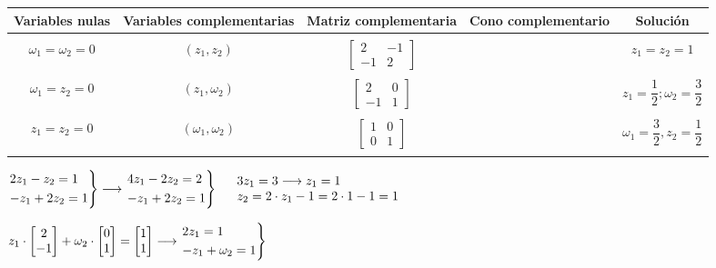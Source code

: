 \begin{enumerate}[label=\color{red}\arabic*.]
\begin{tabular}{c|c|c|c|c}
Variables nulas & Variables complementarias & Matriz complementaria & Cono complementario & Solución\\ \hline \\
$\omega_1=\omega_2=0$ & $(z_1,z_2)$ & $\begin{bmatrix}2 & -1\\-1 & 2\end{bmatrix}$ & & $z_1=z_2=1$\\ \hline \\
$\omega_1=z_2=0$ & $(z_1,\omega_2)$ & $\begin{bmatrix}2 & 0\\ -1 & 1\end{bmatrix}$ & & $z_1=\dfrac{1}{2};\omega_2=\dfrac{3}{2}$\\ \hline \\
$z_1=z_2=0$ & $(\omega_1,\omega_2)$ & $\begin{bmatrix}1&0\\0&1\end{bmatrix}$ & & $\omega_1=\dfrac{3}{2},z_2=\dfrac{1}{2}$ \\ \hline \\
\end{tabular}

$\begin{rcases}
2z_1-z_2=1\\
-z_1+2z_2=1
\end{rcases}\longrightarrow\begin{rcases}
4z_1-2z_2=2\\
-z_1+2z_2=1
\end{rcases}\quad\begin{array}{l}
3z_1=3\longrightarrow z_1=1\\
z_2=2\cdot z_1-1=2\cdot 1-1=1
\end{array}$

$z_1\cdot\begin{bmatrix}2\\-1\end{bmatrix}+\omega_2\cdot\begin{bmatrix}0\\1\end{bmatrix}=\begin{bmatrix}1\\1\end{bmatrix}\longrightarrow\begin{rcases}2z_1=1\\-z_1+\omega_2=1\end{rcases}$


\end{enumerate}
